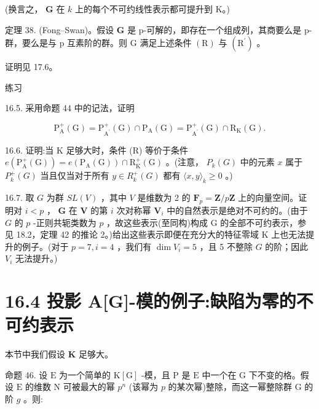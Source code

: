 \documentclass[10pt]{article}
\begin{document}
(换言之， \(\mathbf{G}\) 在 \(k\) 上的每个不可约线性表示都可提升到 K。)

定理 38. (Fong–Swan)。假设 \(\mathbf{G}\) 是 p-可解的，即存在一个组成列，其商要么是 p-群，要么是与 p 互素阶的群。则 \(\mathrm{G}\) 满足上述条件 \(\left( \mathrm{R}\right)\) 与 \(\left( {\mathrm{R}}^{\prime }\right)\) 。

证明见 17.6。

练习

16.5. 采用命题 44 中的记法，证明

\[
{\mathrm{P}}_{\mathrm{A}}^{ + }\left( \mathrm{G}\right)  = {\mathrm{P}}_{{\mathrm{A}}^{\prime }}^{ + }\left( \mathrm{G}\right)  \cap  {\mathrm{P}}_{\mathrm{A}}\left( \mathrm{G}\right)  = {\mathrm{P}}_{{\mathrm{A}}^{\prime }}^{ + }\left( \mathrm{G}\right)  \cap  {\mathrm{R}}_{\mathrm{K}}\left( \mathrm{G}\right) .
\]

16.6. 证明:当 K 足够大时，条件 (R) 等价于条件 \(e\left( {{\mathrm{P}}_{\mathrm{A}}^{ + }\left( \mathrm{G}\right) }\right)  = e\left( {{\mathrm{P}}_{\mathrm{A}}\left( \mathrm{G}\right) }\right)  \cap  {\mathrm{R}}_{\mathrm{K}}^{ + }\left( \mathrm{G}\right)\) 。(注意， \({P}_{k}\left( G\right)\) 中的元素 \(x\) 属于 \({P}_{k}^{ + }\left( G\right)\) 当且仅当对于所有 \(y \in  {R}_{k}^{ + }\left( G\right)\) 都有 \(\langle x,y{\rangle }_{k} \geq  0\) 。)

16.7. 取 \(G\) 为群 \({SL}\left( V\right)\) ，其中 \(V\) 是维数为 2 的 \({\mathbf{F}}_{p} = \mathbf{Z}/p\mathbf{Z}\) 上的向量空间。证明对 \(i < p\) ， \(\mathbf{G}\) 在 \(\mathbf{V}\) 的第 \(i\) 次对称幂 \({\mathbf{V}}_{i}\) 中的自然表示是绝对不可约的。(由于 \(G\) 的 \(p\) -正则共轭类数为 \(p\) ，故这些表示(至同构)构成 G 的全部不可约表示，参见 18.2，定理 42 的推论 2。)给出这些表示即便在充分大的特征零域 K 上也无法提升的例子。(对于 \(p = 7,i = 4\) ，我们有 \(\dim {V}_{i} = 5\) ，且 5 不整除 \(G\) 的阶；因此 \({V}_{i}\) 无法提升。)

\section*{16.4 投影 A[G]-模的例子:缺陷为零的不可约表示}

本节中我们假设 \(\mathbf{K}\) 足够大。

命题 46. 设 \(\mathrm{E}\) 为一个简单的 \(\mathrm{K}\left\lbrack  \mathrm{G}\right\rbrack\) -模，且 \(\mathrm{P}\) 是 \(\mathrm{E}\) 中一个在 G 下不变的格。假设 \(\mathrm{E}\) 的维数 \(\mathrm{N}\) 可被最大的幂 \({p}^{n}\) (该幂为 \(p\) 的某次幂)整除，而这一幂整除群 \(\mathrm{G}\) 的阶 \(g\) 。则:
\end{document}
